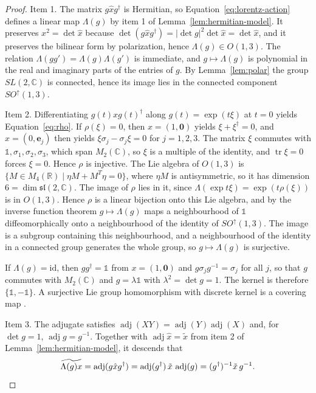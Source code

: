 \begin{proof}
	Item 1. The matrix $g\hat{x}g^\dagger$ is Hermitian, so Equation~\eqref{eq:lorentz-action} defines a linear map $\Lambda(g)$ by item 1 of Lemma~\ref{lem:hermitian-model}. It preserves $x^2=\det\hat{x}$ because $\det(g\hat{x}g^\dagger)=|\det g|^2\det\hat{x}=\det\hat{x}$, and it preserves the bilinear form by polarization, hence $\Lambda(g)\in O(1,3)$. The relation $\Lambda(gg')=\Lambda(g)\Lambda(g')$ is immediate, and $g\mapsto\Lambda(g)$ is polynomial in the real and imaginary parts of the entries of $g$. By Lemma~\ref{lem:polar} the group $SL(2,\mathbb{C})$ is connected, hence its image lies in the connected component $SO^\uparrow(1,3)$.
	
	Item 2. Differentiating $g(t)\hat{x}g(t)^\dagger$ along $g(t)=\exp(t\xi)$ at $t=0$ yields Equation~\eqref{eq:rho}. If $\rho(\xi)=0$, then $x=(1,\mathbf{0})$ yields $\xi+\xi^\dagger=0$, and $x=(0,\mathbf{e}_j)$ then yields $\xi\sigma_j-\sigma_j\xi=0$ for $j=1,2,3$. The matrix $\xi$ commutes with $\mathbb{1},\sigma_1,\sigma_2,\sigma_3$, which span $M_2(\mathbb{C})$, so $\xi$ is a multiple of the identity, and $\operatorname{tr}\xi=0$ forces $\xi=0$. Hence $\rho$ is injective. The Lie algebra of $O(1,3)$ is $\{M\in M_4(\mathbb{R})\mid\eta M+M^T\eta=0\}$, where $\eta M$ is antisymmetric, so it has dimension $6=\dim\mathfrak{sl}(2,\mathbb{C})$. The image of $\rho$ lies in it, since $\Lambda(\exp t\xi)=\exp(t\rho(\xi))$ is in $O(1,3)$. Hence $\rho$ is a linear bijection onto this Lie algebra, and by the inverse function theorem $g\mapsto\Lambda(g)$ maps a neighbourhood of $\mathbb{1}$ diffeomorphically onto a neighbourhood of the identity of $SO^\uparrow(1,3)$. The image is a subgroup containing this neighbourhood, and a neighbourhood of the identity in a connected group generates the whole group, so $g\mapsto\Lambda(g)$ is surjective.
	
	If $\Lambda(g)=\mathrm{id}$, then $gg^\dagger=\mathbb{1}$ from $x=(1,\mathbf{0})$ and $g\sigma_jg^{-1}=\sigma_j$ for all $j$, so that $g$ commutes with $M_2(\mathbb{C})$ and $g=\lambda\mathbb{1}$ with $\lambda^2=\det g=1$. The kernel is therefore $\{\mathbb{1},-\mathbb{1}\}$. A surjective Lie group homomorphism with discrete kernel is a covering map \cite[TODO-location]{TODO-Lee13}.
	
	Item 3. The adjugate satisfies $\operatorname{adj}(XY)=\operatorname{adj}(Y)\operatorname{adj}(X)$ and, for $\det g=1$, $\operatorname{adj}g=g^{-1}$. Together with $\operatorname{adj}\hat{x}=\tilde{x}$ from item 2 of Lemma~\ref{lem:hermitian-model}, it descends that
	\begin{equation*}
		\widetilde{\Lambda(g)x}=\operatorname{adj}(g\hat{x}g^\dagger)=\operatorname{adj}(g^\dagger)\,\tilde{x}\,\operatorname{adj}(g)=(g^\dagger)^{-1}\tilde{x}\,g^{-1}.\qedhere
	\end{equation*}
\end{proof}

